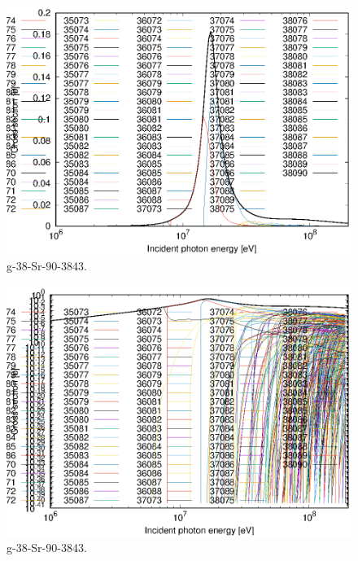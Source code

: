 \begin{figure}
 \includegraphics[width=\linewidth]{eps/g_38-Sr-90_3843.eps}
  \caption{g-38-Sr-90-3843.}
\end{figure}
\begin{figure}
 \includegraphics[width=\linewidth]{eps-log/g_38-Sr-90_3843.eps}
 \caption{g-38-Sr-90-3843.}
\end{figure}
\newpage \clearpage

